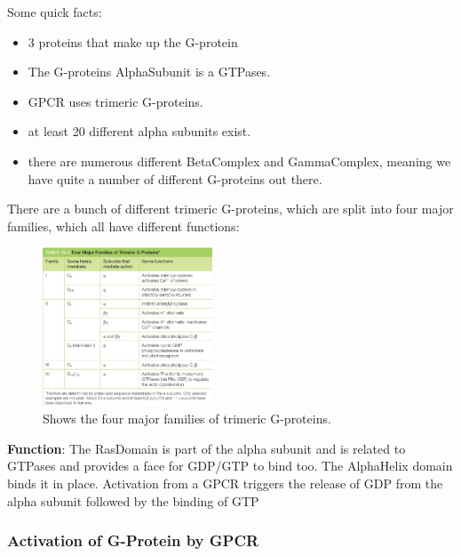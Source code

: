 \documentclass[../main.tex]{subfiles}
\begin{document}
Some quick facts:
\begin{itemize}
	\item 3 proteins that make up the G-protein
	\item The G-proteins \gls{AlphaSubunit} is a \gls{GTPases}.
	\item GPCR uses trimeric G-proteins.
	\item at least 20 different alpha subunits exist.
	\item there are numerous different \gls{BetaComplex} and \gls{GammaComplex}, meaning we have quite a number of different G-proteins out there.
\end{itemize}

There are a bunch of different trimeric G-proteins, which are split into four major families, which all have different functions:
\begin{figure}[H]
	\centering
	\includegraphics[width=0.45\textwidth]{G_families}
	\caption{Shows the four major families of trimeric G-proteins.}
\end{figure}

\textbf{Function}: The \gls{RasDomain} is part of the alpha subunit and is related to GTPases and provides a face for GDP/GTP to bind too. The \gls{AlphaHelix} domain binds it in place. Activation from a GPCR triggers the release of GDP from the alpha subunit followed by the binding of GTP
 
\subsubsection{Activation of G-Protein by GPCR}
\end{document}
